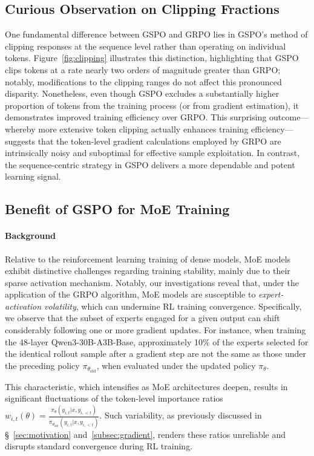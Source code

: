 \subsection{Curious Observation on Clipping Fractions}

One fundamental difference between GSPO and GRPO lies in GSPO's method of clipping responses at the sequence level rather than operating on individual tokens. Figure~\ref{fig:clipping} illustrates this distinction, highlighting that GSPO clips tokens at a rate nearly two orders of magnitude greater than GRPO; notably, modifications to the clipping ranges do not affect this pronounced disparity. Nonetheless, even though GSPO excludes a substantially higher proportion of tokens from the training process (or from gradient estimation), it demonstrates improved training efficiency over GRPO. This surprising outcome—whereby more extensive token clipping actually enhances training efficiency—suggests that the token-level gradient calculations employed by GRPO are intrinsically noisy and suboptimal for effective sample exploitation. In contrast, the sequence-centric strategy in GSPO delivers a more dependable and potent learning signal.

\subsection{Benefit of GSPO for MoE Training}
\label{subsec:routing_replay}

\paragraph{Background}
Relative to the reinforcement learning training of dense models, MoE models exhibit distinctive challenges regarding training stability, mainly due to their sparse activation mechanism. Notably, our investigations reveal that, under the application of the GRPO algorithm, MoE models are susceptible to \textit{expert-activation volatility}, which can undermine RL training convergence. Specifically, we observe that the subset of experts engaged for a given output can shift considerably following one or more gradient updates. For instance, when training the 48-layer Qwen3-30B-A3B-Base, approximately 10\% of the experts selected for the identical rollout sample after a gradient step are not the same as those under the preceding policy $\pi_{\theta_\text{old}}$, when evaluated under the updated policy $\pi_{\theta}$. 

This characteristic, which intensifies as MoE architectures deepen, results in significant fluctuations of the token-level importance ratios $w_{i,t}(\theta) = \frac{ \pi_{\theta} (y_{i,t} | x, y_{i,<t}) }{ \pi_{\theta_\text{old}} (y_{i,t} | x,y_{i,<t})}$. Such variability, as previously discussed in \S~\ref{sec:motivation} and~\ref{subsec:gradient}, renders these ratios unreliable and disrupts standard convergence during RL training.

